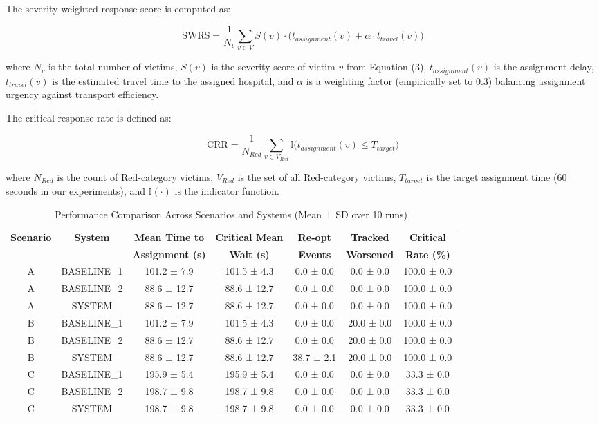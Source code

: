 \documentclass[conference]{IEEEtran}
\begin{document}
The severity-weighted response score is computed as:

\begin{equation}
\text{SWRS} = \frac{1}{N_v} \sum_{v \in V} 
S(v) \cdot \bigl( t_{assignment}(v) + \alpha \cdot t_{travel}(v) \bigr)
\end{equation}

where $N_v$ is the total number of victims, $S(v)$ is the severity score of victim $v$ from Equation (3), $t_{assignment}(v)$ is the assignment delay, $t_{travel}(v)$ is the estimated travel time to the assigned hospital, and $\alpha$ is a weighting factor (empirically set to 0.3) balancing assignment urgency against transport efficiency.

The critical response rate is defined as:

\begin{equation}
\text{CRR} = \frac{1}{N_{Red}} \sum_{v \in V_{Red}} 
\mathbb{I}\bigl( t_{assignment}(v) \leq T_{target} \bigr)
\end{equation}

where $N_{Red}$ is the count of Red-category victims, $V_{Red}$ is the set of all Red-category victims, $T_{target}$ is the target assignment time (60 seconds in our experiments), and $\mathbb{I}(\cdot)$ is the indicator function.

\begin{table}[t]
\caption{Performance Comparison Across Scenarios and Systems (Mean ± SD over 10 runs)}
\label{tab:main}
\centering
\begin{tabular}{|c|c|c|c|c|c|c|}
\hline
\textbf{Scenario} & \textbf{System} & \textbf{Mean Time to} & \textbf{Critical Mean} & \textbf{Re-opt} & \textbf{Tracked} & \textbf{Critical} \\
& & \textbf{Assignment (s)} & \textbf{Wait (s)} & \textbf{Events} & \textbf{Worsened} & \textbf{Rate (\%)} \\
\hline
A & BASELINE\_1 & 101.2 ± 7.9 & 101.5 ± 4.3 & 0.0 ± 0.0 & 0.0 ± 0.0 & 100.0 ± 0.0 \\
A & BASELINE\_2 & 88.6 ± 12.7 & 88.6 ± 12.7 & 0.0 ± 0.0 & 0.0 ± 0.0 & 100.0 ± 0.0 \\
A & SYSTEM & 88.6 ± 12.7 & 88.6 ± 12.7 & 0.0 ± 0.0 & 0.0 ± 0.0 & 100.0 ± 0.0 \\
\hline
B & BASELINE\_1 & 101.2 ± 7.9 & 101.5 ± 4.3 & 0.0 ± 0.0 & 20.0 ± 0.0 & 100.0 ± 0.0 \\
B & BASELINE\_2 & 88.6 ± 12.7 & 88.6 ± 12.7 & 0.0 ± 0.0 & 20.0 ± 0.0 & 100.0 ± 0.0 \\
B & SYSTEM & 88.6 ± 12.7 & 88.6 ± 12.7 & 38.7 ± 2.1 & 20.0 ± 0.0 & 100.0 ± 0.0 \\
\hline
C & BASELINE\_1 & 195.9 ± 5.4 & 195.9 ± 5.4 & 0.0 ± 0.0 & 0.0 ± 0.0 & 33.3 ± 0.0 \\
C & BASELINE\_2 & 198.7 ± 9.8 & 198.7 ± 9.8 & 0.0 ± 0.0 & 0.0 ± 0.0 & 33.3 ± 0.0 \\
C & SYSTEM & 198.7 ± 9.8 & 198.7 ± 9.8 & 0.0 ± 0.0 & 0.0 ± 0.0 & 33.3 ± 0.0 \\
\hline
\end{tabular}
\end{table}
\end{document}
